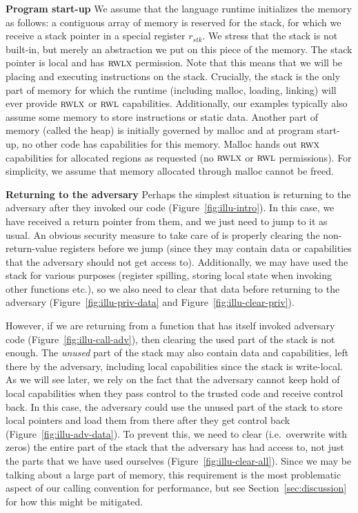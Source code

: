\documentclass[format=acmsmall, review=true, screen=true]{acmart}
\renewcommand{\figurename}{Figure}
\renewcommand{\sectionname}{Section}
\newcommand{\var}[1]{\mathit{#1}}
\newcommand{\stk}{\var{stk}}
\newcommand{\plainperm}[1]{\textsc{#1}}
\newcommand{\rwx}{\plainperm{rwx}}
\newcommand{\readwritel}{\plainperm{rwl}}
\newcommand{\rwl}{\readwritel}
\newcommand{\rwlx}{\plainperm{rwlx}}
\begin{document}
\textbf{Program start-up} We assume that the language runtime initializes the
memory as follows: a contiguous array of memory is reserved for the stack, for
which we receive a stack pointer in a special register $r_\stk$. We stress that
the stack is not built-in, but merely an abstraction we put on this piece of the
memory. The stack pointer is local and has $\rwlx$ permission. Note that this
means that we will be placing and executing instructions on the stack.
Crucially, the stack is the only part of memory for which the runtime (including
malloc, loading, linking) will ever provide $\rwlx$ or $\rwl$ capabilities.
Additionally, our examples typically also assume some memory to store
instructions or static data. Another part of memory (called the heap) is
initially governed by malloc and at program start-up, no other code has
capabilities for this memory. Malloc hands out $\rwx$ capabilities for allocated
regions as requested (no $\rwlx$ or $\rwl$ permissions). For simplicity, we
assume that memory allocated through malloc cannot be freed.

\textbf{Returning to the adversary} Perhaps the simplest situation is returning
to the adversary after they invoked our code (\figurename~\ref{fig:illu-intro}). In this case, we have received a
return pointer from them, and we just need to jump to it as usual. An obvious
security measure to take care of is properly clearing the non-return-value
registers before we jump (since they may contain data or capabilities that the
adversary should not get access to). Additionally, we may have used the stack
for various purposes (register spilling, storing local state when invoking other
functions etc.), so we also need to clear that data before returning to the
adversary (\figurename~\ref{fig:illu-priv-data} and \figurename~\ref{fig:illu-clear-priv}).

However, if we are returning from a function that has itself invoked adversary
code (\figurename~\ref{fig:illu-call-adv}), then clearing the used part of the stack is not enough. The \emph{unused}
part of the stack may also contain data and capabilities, left there by the
adversary, including local capabilities since the stack is write-local. As we
will see later, we rely on the fact that the adversary cannot keep hold of local
capabilities when they pass control to the trusted code and receive control
back. In this case, the adversary could use the unused part of the stack to
store local pointers and load them from there after they get control back (\figurename~\ref{fig:illu-adv-data}). To
prevent this, we need to clear (i.e.\ overwrite with zeros) the entire part of
the stack that the adversary has had access to, not just the parts that we have
used ourselves (\figurename~\ref{fig:illu-clear-all}). Since we may be talking about a large part of memory, this
requirement is the most problematic aspect of our calling convention for
performance, but see \sectionname~\ref{sec:discussion} for how this might be
mitigated.
\end{document}
